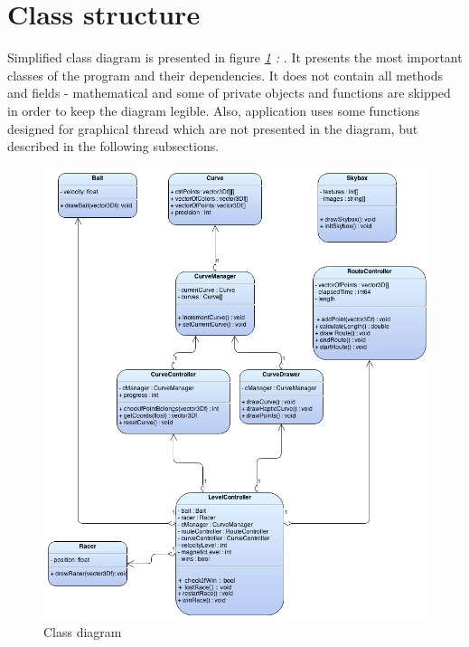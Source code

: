\section{Class structure}
\label{class_structure}
Simplified class diagram is presented in figure \emph{\ref{fig:class} : }. It presents the most important classes of the program and their dependencies. It does not contain all methods and fields - mathematical and some of private objects and functions are skipped in order to keep the diagram legible. Also, application uses some functions designed for graphical thread which are not presented in the diagram, but described in the following subsections.  
\begin{figure}
\begin{center}
	\includegraphics[width=\textwidth]{Images/class_diagram}
	\caption{Class diagram}
	\label{fig:class}	
\end{center}
\end{figure}

